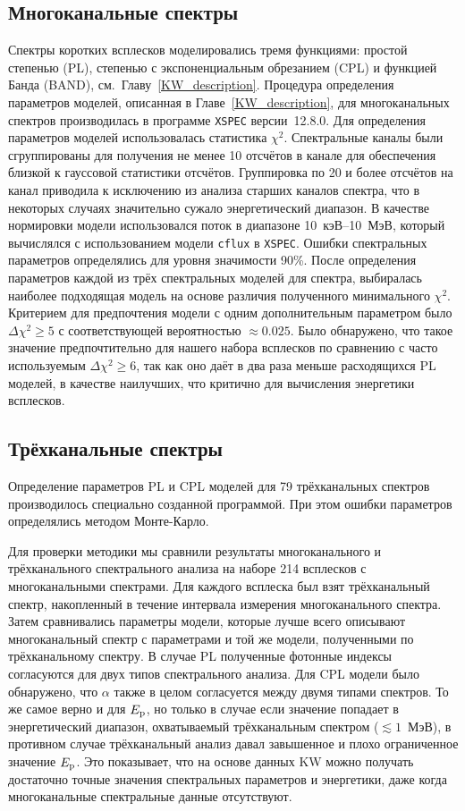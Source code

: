 \subsection{Многоканальные спектры}
Спектры коротких всплесков моделировались тремя функциями: простой степенью (PL), степенью с экспоненциальным 
обрезанием (CPL) и функцией Банда (BAND), см.~Главу~\ref{KW_description}.
Процедура определения параметров моделей, описанная в Главе~\ref{KW_description}, 
для многоканальных спектров производилась в программе 
\texttt{XSPEC}\citep{Arnaud_1996ASPC} версии~12.8.0.
Для определения параметров моделей использовалась статистика $\chi^2$. 
Спектральные каналы были сгруппированы для получения не менее 10 отсчётов в канале для обеспечения 
близкой к гауссовой статистики отсчётов. Группировка по 20 и более отсчётов на канал 
приводила к исключению из анализа старших каналов спектра, 
что в некоторых случаях значительно сужало энергетический диапазон. 
В качестве нормировки модели использовался поток в диапазоне 10~кэВ--10~МэВ, 
который вычислялся с использованием модели \texttt{cflux} в \texttt{XSPEC}.
Ошибки спектральных параметров определялись для уровня 
значимости 90\%.
После определения параметров каждой из трёх спектральных моделей для спектра, 
выбиралась наиболее подходящая модель на основе различия полученного минимального $\chi^2$. 
Критерием для предпочтения модели с одним дополнительным параметром было $\Delta \chi^2 \geq 5$ 
с соответствующей вероятностью $\approx 0.025$. Было обнаружено, что такое значение предпочтительно 
для нашего набора всплесков по сравнению с часто используемым $\Delta \chi^2 \geq 6$,
так как оно даёт в два раза меньше расходящихся PL моделей, в качестве наилучших,
что критично для вычисления энергетики всплесков.


\subsection{Трёхканальные спектры}
Определение параметров PL и CPL моделей для 79 трёхканальных спектров производилось 
специально созданной программой. При этом ошибки параметров определялись методом Монте-Карло.

Для проверки методики мы сравнили результаты многоканального и трёхканального спектрального анализа
на наборе 214 всплесков с многоканальными спектрами.
Для каждого всплеска был взят  трёхканальный спектр, накопленный в течение 
интервала измерения многоканального спектра.
Затем сравнивались параметры модели, которые лучше всего описывают многоканальный спектр
с параметрами и той же модели, полученными по трёхканальному спектру.
В случае PL полученные фотонные индексы согласуются для двух типов
спектрального анализа. Для CPL модели было обнаружено, что  $\alpha$ также в целом
согласуется между двумя типами спектров. То же самое верно и для $E_{\mathrm{p}}$, но
только в случае если значение попадает в энергетический диапазон, охватываемый трёхканальным спектром
($\lesssim 1$~МэВ), в противном случае трёхканальный анализ давал завышенное и 
плохо ограниченное значение $E_{\mathrm{p}}$. Это показывает, что на основе данных KW 
можно получать достаточно точные значения спектральных параметров и энергетики,
даже когда многоканальные спектральные данные отсутствуют.

